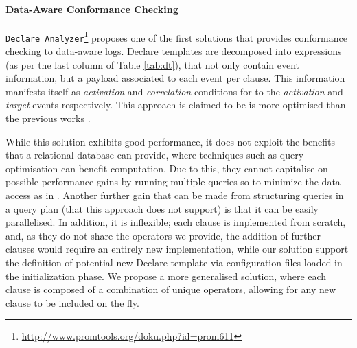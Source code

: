 \paragraph*{Data-Aware Conformance Checking}
\texttt{Declare Analyzer}\footnote{\url{http://www.promtools.org/doku.php?id=prom611}} \cite{BurattinMS16} proposes one of the first solutions that provides conformance checking to data-aware logs. Declare templates are decomposed into \LTLf expressions (as per the last column of Table \ref{tab:dt}), that not only contain event information, but a payload associated to each event per clause. This information manifests itself as \emph{activation} and \emph{correlation} conditions for to the \emph{activation} and \emph{target} events respectively. This approach is claimed to be is more optimised than the previous works \cite{VanDerAalst2005}.%

While this solution exhibits good performance, it does not exploit the benefits that a relational database can provide, where techniques such as query optimisation can benefit computation. Due to this, they cannot capitalise on possible performance gains by running multiple queries so to minimize the data access as in \cite{BellatrecheKB21}. Another further gain that can be made from structuring queries in a query plan (that this approach does not support) is that it can be easily parallelised. In addition, it is inflexible; each clause is implemented from scratch, and, as they do not share the operators we provide, the addition of further clauses would require an entirely new implementation, while our solution support the definition of potential new Declare template via configuration files loaded in the initialization phase. We propose a more generalised solution, where each clause is composed of a combination of unique operators, allowing for any new clause to be included on the fly. 

